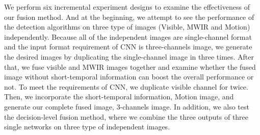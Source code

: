 \documentclass[journal]{IEEEtran}
\begin{document}
We perform six incremental experiment designs to examine the effectiveness of our fusion method. And at the beginning, we attempt to see the performance of the detection algorithms on three type of images (Visible, MWIR and Motion) independently. Because all of the independent images are single-channel format and the input format requirement of CNN is three-channels image, we generate the desired images by duplicating the single-channel image in three times. After that, we fuse visible and MWIR images together and examine whether the fused image without short-temporal information can boost the overall performance or not. To meet the requirements of CNN, we duplicate visible channel for twice. Then, we incorporate the short-temporal information, Motion image, and generate our complete fused image, 3-channels image. In addition, we also test the decision-level fusion method, where we combine the three outputs of three single networks on three type of independent images.  




\newcommand{\ra}[1]{\renewcommand{\arraystretch}{#1}}
\end{document}
